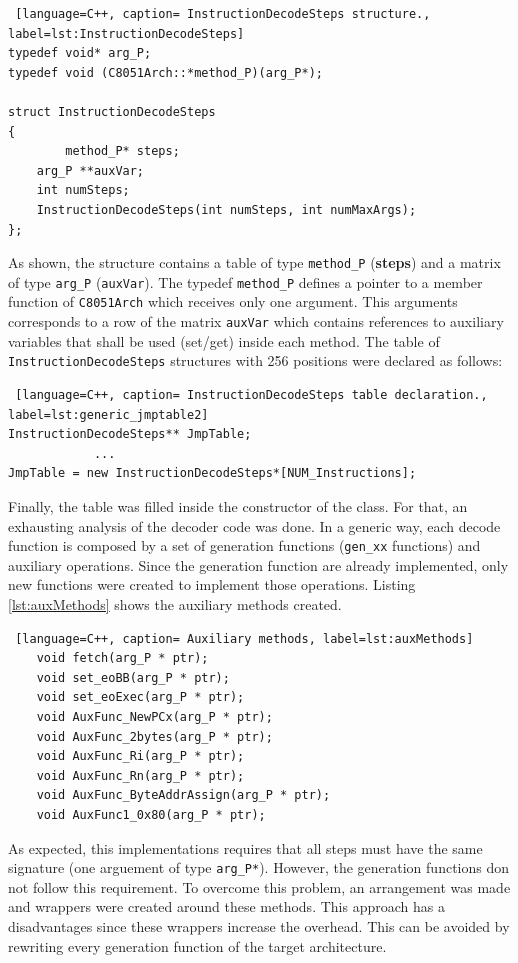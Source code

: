 \begin{lstlisting} [language=C++, caption= InstructionDecodeSteps structure., label=lst:InstructionDecodeSteps]
typedef void* arg_P;
typedef void (C8051Arch::*method_P)(arg_P*);

struct InstructionDecodeSteps 
{
		method_P* steps;
    arg_P **auxVar;
    int numSteps;
    InstructionDecodeSteps(int numSteps, int numMaxArgs);
};
\end{lstlisting}

As shown, the structure contains a table of type \texttt{method\_P} (\textbf{steps}) and a matrix of type \texttt{arg\_P} (\texttt{auxVar}). The typedef \texttt{method\_P} defines a pointer to a member function of \texttt{C8051Arch} which receives only one argument. This arguments corresponds to a row of the matrix \texttt{auxVar} which contains references to auxiliary variables that shall be used (set/get) inside each method. The table of \texttt{InstructionDecodeSteps} structures with 256 positions were declared as follows:

\begin{lstlisting} [language=C++, caption= InstructionDecodeSteps table declaration., label=lst:generic_jmptable2]
InstructionDecodeSteps** JmpTable;
			...
JmpTable = new InstructionDecodeSteps*[NUM_Instructions];	
\end{lstlisting}

Finally, the table was filled inside the constructor of the class. For that, an exhausting analysis of the decoder code was done. In a generic way, each decode function is composed by a set of generation functions (\texttt{gen\_xx} functions) and auxiliary operations. Since the generation function are already implemented, only new functions were created to implement those operations. Listing \ref{lst:auxMethods} shows the auxiliary methods created.    

\begin{lstlisting} [language=C++, caption= Auxiliary methods, label=lst:auxMethods]
	void fetch(arg_P * ptr);
	void set_eoBB(arg_P * ptr);
	void set_eoExec(arg_P * ptr);
	void AuxFunc_NewPCx(arg_P * ptr);
	void AuxFunc_2bytes(arg_P * ptr);
	void AuxFunc_Ri(arg_P * ptr);
	void AuxFunc_Rn(arg_P * ptr);
	void AuxFunc_ByteAddrAssign(arg_P * ptr);
	void AuxFunc1_0x80(arg_P * ptr);
\end{lstlisting}

As expected, this implementations requires that all steps must have the same signature (one arguement of type \texttt{arg\_P*}). However, the generation functions don not follow this requirement. To overcome this problem, an arrangement was made and wrappers were created around these methods. This approach has a disadvantages since these wrappers increase the overhead. This can be avoided by rewriting every generation function of the target architecture.

